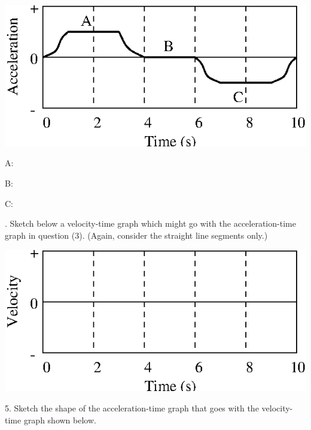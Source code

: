 \vspace{0.3cm}
{\par\centering \includegraphics{slowing/slowing_fig8.eps} \par}
\vspace{0.3cm}

\hspace{20mm}A: 
\answerspace{10mm}

\hspace{20mm}B: 
\answerspace{10mm}

\hspace{20mm}C:
\answerspace{10mm}

. Sketch below a velocity-time graph which might go with the acceleration-time
graph in question (3). (Again, consider the straight line segments only.)

\vspace{0.3cm}
{\par\centering \includegraphics{slowing/slowing_fig9.eps} \par}
\vspace{0.3cm}

5. Sketch the shape of the acceleration-time graph that goes with the velocity-time
graph shown below.

